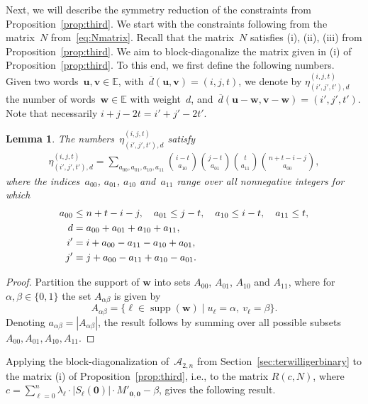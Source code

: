 \documentclass[10pt,a4paper]{article}
\newtheorem{lemma}[theorem]{Lemma}
\theoremstyle{definition}
\newcommand{\uu}{\mathbf{u}}
\newcommand{\vv}{\mathbf{v}}
\newcommand{\ww}{\mathbf{w}}
\newcommand{\zero}{\mathbf{0}}
\DeclareMathOperator*{\supp}{supp}
\begin{document}
Next, we will describe the symmetry reduction of the constraints from Proposition~\ref{prop:third}. We start with the constraints following from the matrix~$N$ from~\eqref{eq:Nmatrix}. Recall that the matrix~$N$ satisfies (i), (ii), (iii) from Proposition~\ref{prop:third}. We aim to block-diagonalize the matrix given in (i) of Proposition~\ref{prop:third}. To this end, we first define the following numbers. Given two words~$\uu,\vv \in \mathbb{E}$, with~$\overline{d}(\uu,\vv)=(i,j,t)$, we denote by $\eta_{(i',j',t'),d}^{(i,j,t)}$ the number of words~$\ww \in \mathbb{E}$ with weight~$d$, and~$\overline{d}(\uu-\ww,\vv-\ww)=(i',j',t')$. Note that necessarily $i+j-2t=i'+j'-2t'$. 
\begin{lemma}\label{lem:etabinary}
 The numbers~$\eta_{(i',j',t'),d}^{(i,j,t)}$ satisfy
\begin{align}
\eta_{(i',j',t'),d}^{(i,j,t)} =  \sum_{a_{00},a_{01},a_{10},a_{11}} \binom{i-t}{a_{10}} \binom{j-t}{a_{01}} \binom{t}{a_{11}}\binom{n+t-i-j}{a_{00}},
\end{align}
where the indices~$a_{00}$, $a_{01}$, $a_{10}$ and~$a_{11}$ range over all nonnegative integers for which
\begin{align}
a_{00} &\leq n+t-i-j, \quad a_{01} \leq j-t, \quad a_{10} \leq i-t, \quad a_{11} \leq t, \\ 
  d&= a_{00}+a_{01}+a_{10}+a_{11},\notag\\
i'&= i+a_{00}-a_{11}-a_{10}+a_{01},\notag\\
j'&= j+a_{00}-a_{11}+a_{10}-a_{01}.\notag
\end{align}
\end{lemma}
\begin{proof}
Partition the support of $\ww$ into sets $A_{00}$, $A_{01}$, $A_{10}$ and $A_{11}$, where for $\alpha,\beta\in \{0,1\}$ the set $A_{\alpha\beta}$ is given by
\[
A_{\alpha\beta}=\{\ell\in\supp(\ww )\mid u_\ell=\alpha,\ v_\ell=\beta\}.
\]
Denoting $a_{\alpha\beta}=|A_{\alpha\beta}|$, the result follows by summing over all possible subsets $A_{00},A_{01},A_{10},A_{11}$.  
\end{proof}

Applying the block-diagonalization of~$\mathcal{A}_{2,n}$ from Section~\ref{sec:terwilligerbinary} to the matrix (i) of Proposition~\ref{prop:third}, i.e., to the matrix $R(c,N)$, where $c=\sum_{\ell=0}^n \lambda_{\ell}\cdot|S_{\ell}(\zero)|\cdot M'_{\zero,\zero}
 - \beta$, gives the following result. 
\end{document}
